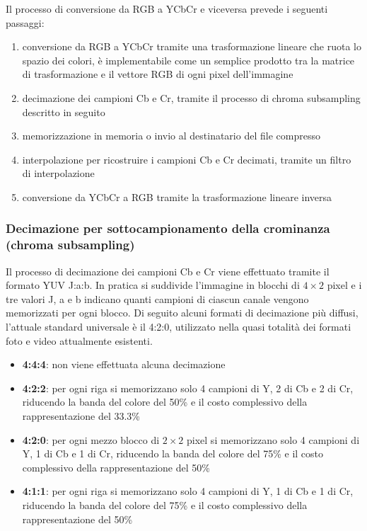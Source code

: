 \noindent
Il processo di conversione da RGB a YCbCr e viceversa prevede i seguenti passaggi:
\begin{enumerate}
	\item conversione da RGB a YCbCr tramite una trasformazione lineare che ruota lo spazio dei colori, è implementabile
	come un semplice prodotto tra la matrice di trasformazione e il vettore RGB di ogni pixel dell'immagine
	\item decimazione dei campioni Cb e Cr, tramite il processo di chroma subsampling descritto in seguito
	\item memorizzazione in memoria o invio al destinatario del file compresso
	\item interpolazione per ricostruire i campioni Cb e Cr decimati, tramite un filtro di interpolazione
	\item conversione da YCbCr a RGB tramite la trasformazione lineare inversa
\end{enumerate}

\subsubsection*{Decimazione per sottocampionamento della crominanza (chroma subsampling)}
Il processo di decimazione dei campioni Cb e Cr viene effettuato tramite il formato YUV J:a:b. In pratica si suddivide
l'immagine in blocchi di \(4 \times 2\) pixel e i tre valori J, a e b indicano quanti campioni di ciascun canale vengono
memorizzati per ogni blocco. Di seguito alcuni formati di decimazione più diffusi, l'attuale standard universale è
il 4:2:0, utilizzato nella quasi totalità dei formati foto e video attualmente esistenti.
\begin{itemize}
	\item \textbf{4:4:4}: non viene effettuata alcuna decimazione
	\item \textbf{4:2:2}: per ogni riga si memorizzano solo 4 campioni di Y, 2 di Cb e 2 di Cr, riducendo la banda del
	colore del 50\% e il costo complessivo della rappresentazione del 33.3\%
	\item \textbf{4:2:0}: per ogni mezzo blocco di \(2 \times 2\) pixel si memorizzano solo 4 campioni di Y, 1 di Cb
	e 1 di Cr, riducendo la banda del colore del 75\% e il costo complessivo della rappresentazione del 50\%
	\item \textbf{4:1:1}: per ogni riga si memorizzano solo 4 campioni di Y, 1 di Cb e 1 di Cr, riducendo la banda del
	colore del 75\% e il costo complessivo della rappresentazione del 50\%
\end{itemize}

